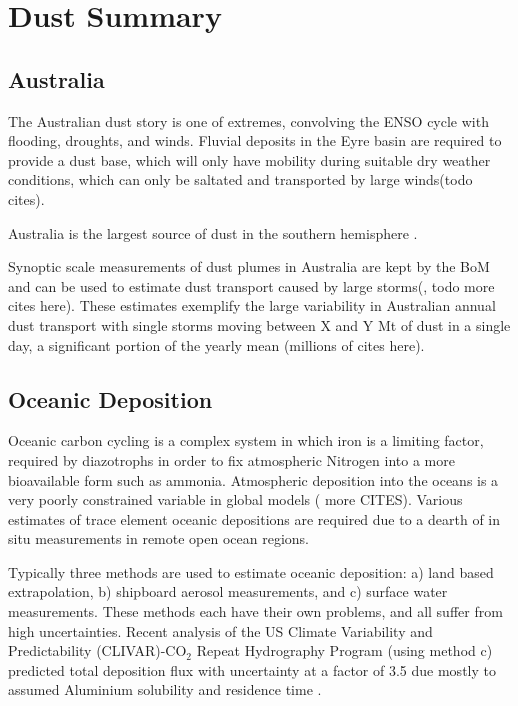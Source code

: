 \section{Dust Summary}

\subsection{Australia}

The Australian dust story is one of extremes, convolving the ENSO cycle with flooding, droughts, and winds.
Fluvial deposits in the Eyre basin are required to provide a dust base, which will only have mobility during suitable dry weather conditions, which can only be saltated and transported by large winds(todo cites).

Australia is the largest source of dust in the southern hemisphere \cite{Rotstayn_2011}.

Synoptic scale measurements of dust plumes in Australia are kept by the BoM and can be used to estimate dust transport caused by large storms(\cite{Leys_2011}, todo more cites here). 
These estimates exemplify the large variability in Australian annual dust transport with single storms moving between X and Y Mt of dust in a single day, a significant portion of the yearly mean (millions of cites here).

\subsection{Oceanic Deposition}
Oceanic carbon cycling is a complex system in which iron is a limiting factor, required by diazotrophs in order to fix atmospheric Nitrogen into a more bioavailable form such as ammonia. 
Atmospheric deposition into the oceans is a very poorly constrained variable in global models (\cite{Grand_2015} more CITES). 
Various estimates of trace element oceanic depositions are required due to a dearth of in situ measurements in remote open ocean regions.

Typically three methods are used to estimate oceanic deposition: a) land based extrapolation, b) shipboard aerosol measurements, and c) surface water measurements. 
These methods each have their own problems, and all suffer from high uncertainties. 
Recent analysis of the US Climate Variability and Predictability (CLIVAR)-CO$_2$ Repeat Hydrography Program (using method c) predicted total deposition flux with uncertainty at a factor of 3.5 due mostly to assumed Aluminium solubility and residence time \cite{Grand_2015}.
  
  
  